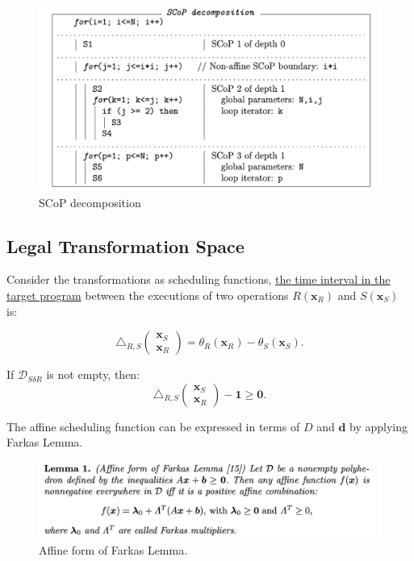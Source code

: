 \begin{figure}[ht]
  \centering
  \includegraphics[scale=0.40]{images/SCoP_decomposition.png}
  \caption{SCoP decomposition}
\end{figure}

\subsection{Legal Transformation Space}

Consider the transformations as scheduling functions, \underline{the time interval
in the target program} between the executions of two operations $R(\bm{x}_R)$
and $S(\bm{x}_S)$ is:

\begin{equation}
\triangle_{R,S}\left(\begin{matrix}\bm{x}_S \\ \bm{x}_R \end{matrix} \right) =
\theta_R(\bm{x}_R) - \theta_S(\bm{x}_S).
\end{equation}

If $\mathcal{D}_{S\delta R}$ is not empty, then:
\begin{equation}
\triangle_{R,S}\left(\begin{matrix}\bm{x}_S \\ \bm{x}_R \end{matrix} \right) - \bm{1} \ge \bm{0} \label{legal}.
\end{equation}

The affine scheduling function can be expressed in terms of $D$ and $\bm{d}$ by
applying Farkas Lemma.
\begin{figure}[ht]
  \centering
  \includegraphics[scale=0.25]{images/farkas_lemma.png}
  \caption{Affine form of Farkas Lemma.}
\end{figure}

